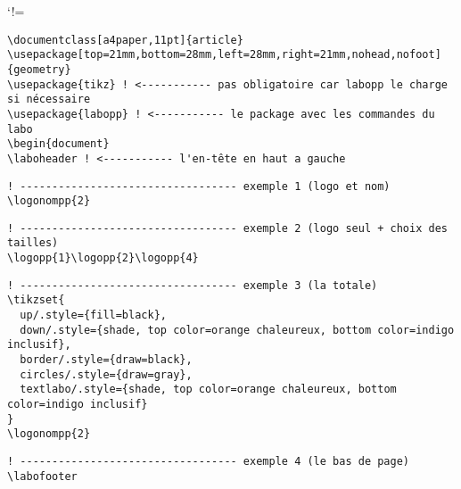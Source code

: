 \documentclass[a4paper,11pt]{article}
\begin{document}
\laboheader

\def\CommentChar{\char37}
\catcode`!=\active
\begin{Verbatim}[defineactive=\def!{\color{orange}\CommentChar}]
\documentclass[a4paper,11pt]{article}
\usepackage[top=21mm,bottom=28mm,left=28mm,right=21mm,nohead,nofoot]{geometry}
\usepackage{tikz} ! <----------- pas obligatoire car labopp le charge si nécessaire
\usepackage{labopp} ! <----------- le package avec les commandes du labo
\begin{document}
\laboheader ! <----------- l'en-tête en haut a gauche
\end{Verbatim}


\begin{Verbatim}[defineactive=\def!{\color{orange}\CommentChar}]
! ---------------------------------- exemple 1 (logo et nom)
\logonompp{2}
\end{Verbatim}

\begin{Verbatim}[defineactive=\def!{\color{orange}\CommentChar}]
! ---------------------------------- exemple 2 (logo seul + choix des tailles)
\logopp{1}\logopp{2}\logopp{4}
\end{Verbatim}


\begin{Verbatim}[defineactive=\def!{\color{orange}\CommentChar}]
! ---------------------------------- exemple 3 (la totale)
\tikzset{
  up/.style={fill=black},
  down/.style={shade, top color=orange chaleureux, bottom color=indigo inclusif},
  border/.style={draw=black},
  circles/.style={draw=gray},
  textlabo/.style={shade, top color=orange chaleureux, bottom color=indigo inclusif}
}
\logonompp{2}
\end{Verbatim}
{ %
}



\vfill

\begin{Verbatim}[defineactive=\def!{\color{orange}\CommentChar}]
! ---------------------------------- exemple 4 (le bas de page)
\labofooter
\end{Verbatim}
\labofooter
\end{document}
